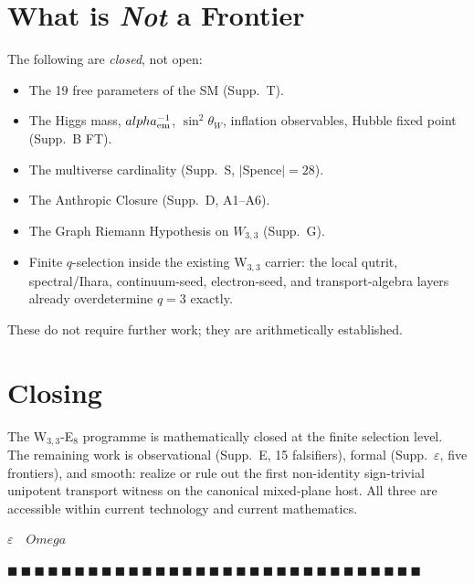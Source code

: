\documentclass[12pt,a4paper]{article}
\def\alpha{alpha}%
\def\Omega{Omega}%
\theoremstyle{definition}
\begin{document}
\section*{What is \emph{Not} a Frontier}

The following are \emph{closed}, not open:
\begin{itemize}[leftmargin=2em,nosep]
\item The 19 free parameters of the SM (Supp.~T).
\item The Higgs mass, $\alpha_{\rm em}^{-1}$, $\sin^2\theta_W$,
inflation observables, Hubble fixed point (Supp.~B FT).
\item The multiverse cardinality (Supp.~S, $|$Spence$|=28$).
\item The Anthropic Closure (Supp.~D, A1--A6).
\item The Graph Riemann Hypothesis on $W_{3,3}$ (Supp.~G).
\item Finite $q$-selection inside the existing W$_{3,3}$ carrier: the
local qutrit, spectral/Ihara, continuum-seed, electron-seed, and
transport-algebra layers already overdetermine $q=3$ exactly.
\end{itemize}
These do not require further work; they are arithmetically
established.

\section*{Closing}

The W$_{3,3}$-E$_8$ programme is mathematically closed at the finite
selection level. The remaining work is observational (Supp.~E, 15
falsifiers), formal (Supp.~$\varepsilon$, five frontiers), and smooth:
realize or rule out the first non-identity sign-trivial unipotent
transport witness on the canonical mixed-plane host. All three are
accessible within current technology and current mathematics.

\hfill$\varepsilon \quad\Omega$

\hfill $\blacksquare\ \blacksquare\ \blacksquare\ \blacksquare\ \blacksquare\ \blacksquare\ \blacksquare\ \blacksquare\ \blacksquare\ \blacksquare\ \blacksquare\ \blacksquare\ \blacksquare\ \blacksquare\ \blacksquare\ \blacksquare\ \blacksquare\ \blacksquare\ \blacksquare\ \blacksquare\ \blacksquare\ \blacksquare\ \blacksquare\ \blacksquare\ \blacksquare\ \blacksquare\ \blacksquare\ \blacksquare\ \blacksquare\ \blacksquare\ \blacksquare$

\clearpage
\end{document}
